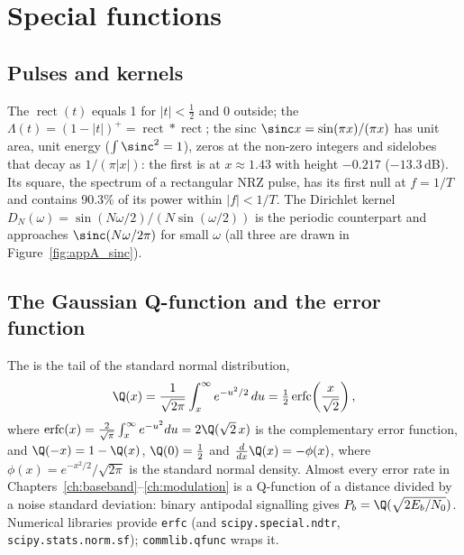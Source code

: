 \section{Special functions}
\label{sec:appA:special}

\subsection{Pulses and kernels}

The  $\operatorname{rect}(t)$ equals 1 for $|t|<\tfrac12$ and 0 outside; the
 $\Lambda(t)=(1-|t|)^+=\operatorname{rect}*\operatorname{rect}$; the sinc
$\sinc x=\sin(\pi x)/(\pi x)$ has unit area, unit energy ($\int\sinc^2=1$), zeros at the
non-zero integers and sidelobes that decay as $1/(\pi|x|)$: the first is at $x\approx1.43$
with height $-0.217$ ($-13.3$\,dB). Its square, the spectrum of a rectangular NRZ pulse, has its
first null at $f=1/T$ and contains 90.3\% of its power within $|f|<1/T$. The Dirichlet kernel
$D_N(\omega)=\sin(N\omega/2)/(N\sin(\omega/2))$ is the periodic counterpart and approaches
$\sinc(N\omega/2\pi)$ for small $\omega$ (all three are drawn in Figure~\ref{fig:appA_sinc}).

\subsection{The Gaussian Q-function and the error function}

The  is the tail of the standard normal distribution,
\begin{equation}
\Q(x)=\frac{1}{\sqrt{2\pi}}\int_x^{\infty}e^{-u^2/2}\,du=\tfrac12\operatorname{erfc}\!\left(\frac{x}{\sqrt2}\right),
\label{eq:appA:q}
\end{equation}
where $\operatorname{erfc}(x)=\frac{2}{\sqrt\pi}\int_x^\infty e^{-u^2}du=2\Q(\sqrt2\,x)$ is the
complementary error function,
and $\Q(-x)=1-\Q(x)$, $\Q(0)=\tfrac12$ and $\frac{d}{dx}\Q(x)=-\phi(x)$, where
$\phi(x)=e^{-x^2/2}/\sqrt{2\pi}$ is the standard normal density. Almost every error rate in
Chapters~\ref{ch:baseband}--\ref{ch:modulation} is a Q-function of a distance divided by a noise
standard deviation: binary antipodal signalling gives $P_b=\Q(\sqrt{2E_b/N_0})$. Numerical
libraries provide \texttt{erfc} (and \texttt{scipy.special.ndtr}, \texttt{scipy.stats.norm.sf});
\texttt{commlib.qfunc} wraps it.

